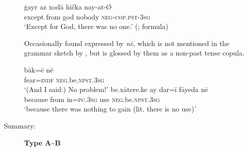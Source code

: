 \documentclass[output=paper,colorlinks,citecolor=brown]{langscibook}
\begin{document}
\begin{paperappendix}
\begin{unindented}
\begin{description}
\begin{exe}\ex \gll ġayr az xodā hīčka nay-at-Ø \\
except from god   nobody \textsc{neg-cop.pst-3sg} \\
    \glt `Except for God, there was no one.'
(\citealt[123]{NourzaeiJahani2015}; formula)
    \end{exe}
%
Occasionally found expressed by \textit{nē}, which is not mentioned in the grammar sketch by \citeauthor{NourzaeiJahani2015}, but is glossed by them as a non-past tense copula.
%
\begin{exe}\ex \gll bāk=ē nē \\
fear=\textsc{indf}    \textsc{neg}.be.\textsc{npst.3sg} \\
    \glt `(And I said:) No problem!' \parencite[149]{NourzaeiJahani2015}
\ex \gll be.xātere.ke ay dar=ī fāyeda nē \\
because from in=\textsc{pc}.\textsc{3sg} use \textsc{neg}.be.\textsc{npst.3sg} \\
    \glt `because there was nothing to gain (lit. there is no use)'
\parencite[144]{NourzaeiJahani2015}
    \end{exe}

\item[Summary:] \textbf{Type A{\textasciitilde}B}
\end{description}
 \parencite[see][]{Bashir2006}

 \parencite{NeukomPatnaik2003}


\end{unindented}
\end{paperappendix}
\end{document}
